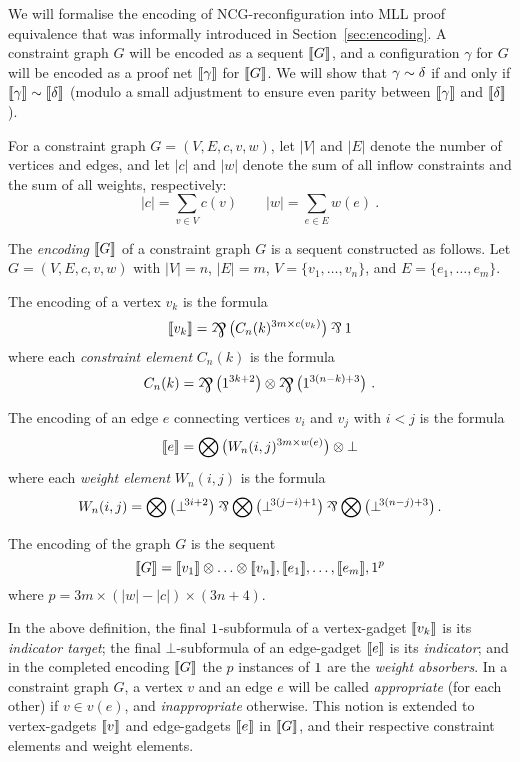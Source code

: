 \documentclass{lmcs}
\let\capsabbrev=\uppercase
\begin{document}
%
We will formalise the encoding of \capsabbrev{ncg}-reconfiguration into \capsabbrev{mll} proof equivalence that was informally introduced in Section~\ref{sec:encoding}.
%
A constraint graph $G$ will be encoded as a sequent $\llbracket G\rrbracket$, and a configuration $\gamma$ for $G$ will be encoded as a proof net $\llbracket\gamma\rrbracket$ for $\llbracket G\rrbracket$.
%
We will show that $\gamma\perm\delta$ if and only if $\itn\gamma\perm\itn\delta$ (modulo a small adjustment to ensure even parity between $\llbracket\gamma\rrbracket$ and $\llbracket\delta\rrbracket$).


For a constraint graph $G=(V,E,c,v,w)$, let $|V|$ and $|E|$ denote the number of vertices and edges, and let $|c|$ and $|w|$ denote the sum of all inflow constraints and the sum of all weights, respectively:
\[
	|c| = \sum_{v\in V}c(v) \qquad |w| = \sum_{e\in E}w(e)~.
\]


\begin{definition}
\label{def:graph encoding}
The \emph{encoding} $\llbracket G\rrbracket$ of a constraint graph $G$ is a sequent constructed as follows.
%
Let $G=(V,E,c,v,w)$ with $|V|=n$, $|E|=m$, $V=\{v_1,\dotsc,v_n\}$, and $E=\{e_1,\dotsc,e_m\}$.

\noindent
The encoding of a vertex $v_k$ is the formula
\[
	\itn{v_k} = \bigparr\big(C_n(k)^{3m\times c(v_k)} \big)\parr\1
\]
where each \emph{constraint element} $C_n(k)$ is the formula
\[
	C_n(k) = \bigparr\big(1^{3k+2}\big) \tn \bigparr\big(1^{3(n-k)+3}\big)~.
\]

\noindent
The encoding of an edge $e$ connecting vertices $v_i$ and $v_j$ with $i<j$ is the formula
\[
	\llbracket e\rrbracket = \bigotimes\big(W_n(i,j)^{3m\times w(e)}\big)\otimes\bot
\]
where each \emph{weight element} $W_n(i,j)$ is the formula
\[
	W_n(i,j) = \bigtn\big(\bot\!^{3i+2}\big)\parr\bigtn\big(\bot\!^{3(j-i)+1}\big)\parr\bigtn\big(\bot\!^{3(n-j)+3}\big)\,.
\]

\noindent
The encoding of the graph $G$ is the sequent
\[
	\llbracket G\rrbracket = \llbracket v_1\rrbracket\otimes\dotso\otimes\llbracket v_n\rrbracket, \llbracket e_1\rrbracket,\dotsc,\llbracket e_m\rrbracket, 1^p
\]
where $p=3m\times(|w|-|c|)\times(3n+4)$.

\end{definition}



In the above definition, the final $1$-subformula of a vertex-gadget $\llbracket v_k\rrbracket$ is its \emph{indicator target}; the final $\bot$-subformula of an edge-gadget $\llbracket e\rrbracket$ is its \emph{indicator}; and in the completed encoding $\llbracket G\rrbracket$ the $p$ instances of $1$ are the \emph{weight absorbers}.
%
In a constraint graph $G$, a vertex $v$ and an edge $e$ will be called \emph{appropriate} (for each other) if $v\in v(e)$, and \emph{inappropriate} otherwise.
%
This notion is extended to vertex-gadgets $\llbracket v\rrbracket$ and edge-gadgets $\llbracket e\rrbracket$ in $\llbracket G\rrbracket$, and their respective constraint elements and weight elements.
\end{document}
